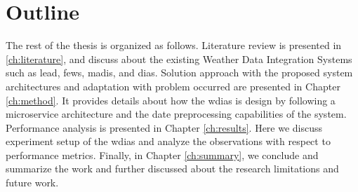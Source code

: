 \section{Outline}
The rest of the thesis is organized as follows. Literature review is presented in \cref{ch:literature}, and discuss about the existing Weather Data Integration Systems such as \acrshort{lead}, \acrshort{fews}, \acrshort{madis}, and \acrshort{dias}. Solution approach with the proposed system architectures and adaptation with problem occurred are presented in Chapter \ref{ch:method}. It provides details about how the \acrshort{wdias} is design by following a microservice architecture and the date preprocessing capabilities of the system. Performance analysis is presented in Chapter \ref{ch:results}. Here we discuss experiment setup of the \acrshort{wdias} and analyze the observations with respect to performance metrics. Finally, in Chapter \ref{ch:summary}, we conclude and summarize the work and further discussed about the research limitations and future work.
